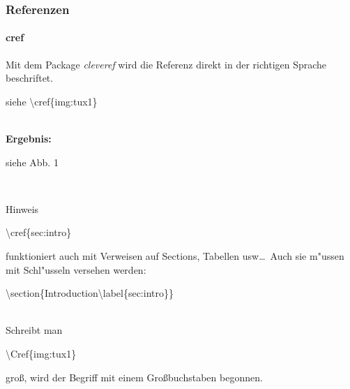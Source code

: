 \begin{frame}
\frametitle{Referenzen}
\framesubtitle{cref}

Mit dem Package \textit{cleveref} wird die Referenz direkt in der richtigen Sprache beschriftet.\\[3mm]

\begin{ttfamily}siehe 
\color{nounibaredI}\textbackslash cref\color{black}\{img:tux1\}\end{ttfamily}\\[3mm]
\textbf{Ergebnis:}\\[3mm]

\begin{rm}
siehe Abb. 1 \end{rm}\\[3mm]

\medskip

\begin{block}{Hinweis}
\begin{ttfamily}\color{nounibaredI}\textbackslash cref\color{black}\{sec:intro\}\end{ttfamily} funktioniert auch mit Verweisen auf Sections, Tabellen usw\ldots ~Auch sie m"ussen mit Schl"usseln versehen werden: \begin{ttfamily}\color{nounibaredI}\textbackslash section\color{black}\{Introduction\color{nounibaredI}\textbackslash label\color{black}\{sec:intro\}\}\end{ttfamily}\\[3mm] %
Schreibt man \begin{ttfamily}\color{nounibaredI}\textbackslash Cref\color{black}\{img:tux1\}\end{ttfamily} groß, wird der Begriff mit einem Großbuchstaben begonnen.
\end{block}

\end{frame}

